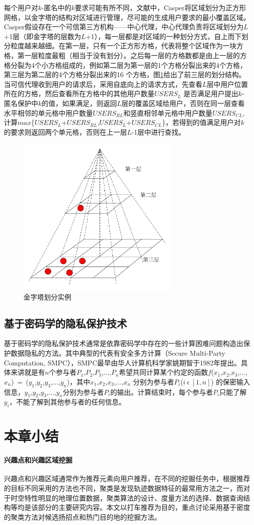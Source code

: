 每个用户对$k$-匿名中的$k$要求可能有所不同，文献\cite{Mokbel}中，Casper将区域划分为正方形网格，以金字塔的结构对区域进行管理，尽可能的生成用户要求的最小覆盖区域。Casper假设存在一个可信第三方机构——中心代理，中心代理负责将区域划分为$L$+1层（即金字塔的层数为$L$+1），每一层都是对区域的一种划分方式，自上而下划分粒度越来越细。在第一层，只有一个正方形方格，代表将整个区域作为一块方格，第一层粒度最粗（相当于没有划分）。之后每一层的方格数都是由上一层的方格分裂为4个小方格组成的，例如第二层为第一层的1个方格分裂出来的4个方格，第三层为第二层的4个方格分裂出来的16 个方格，图\ref{fig:GoldTower_pdf}给出了前三层的划分结构。当可信代理收到用户的请求后，采用自底向上的请求方式，先查看$L$层中用户位置所在的方格，然后查看所在方格中的其他用户数量$USERS_L$ 是否满足用户提出$k$- 匿名保护中$k$的值，如果满足，则返回$L$层的覆盖区域给用户，否则在同一层查看水平相邻的单元格中用户数量$USERS_{RL}$和竖直相邻单元格中用户数量$USERS_{CL}$, 计算$max$\{$USERS_L$+$USERS_{RL}$,$USERS_L$+$USERS_{CL}$\}，若得到的值满足用户对$k$的要求则返回两个单元格，否则在上一层$L$-1层中进行查找。
\begin{figure}[H]
\centering
\includegraphics[width=8cm]{fig/GoldTower.pdf}
\caption{金字塔划分实例} %
\label{fig:GoldTower_pdf}
\end{figure}
\subsection{基于密码学的隐私保护技术}
基于密码学的隐私保护技术通常是依靠密码学中存在的一些计算困难问题构造出保护数据隐私的方法。其中典型的代表有安全多方计算（Secure Multi-Party Computation, SMPC），SMPC最早由华人计算机科学家姚期智于1982年提出\cite{}。具体来讲就是有$n$个参与者$P_1$,$P_2$,$P_3$,...,$P_n$希望共同计算某个约定的函数$f$($x_1$,$x_2$,$x_3$,...,$x_n$)~=~($y_1$,$y_2$,$y_3$,...,$y_n$)，其中$x_1$,$x_2$,$x_3$,...,$x_n$ 分别为参与者$P_i$($i ~\epsilon ~[1,n]$) 的保密输入信息，$y_1$,$y_2$,$y_3$,...,$y_n$分别为参与者$P_i$的输出。计算结束时，每个参与者$P_i$只能了解$y_i$，不能了解到其他参与者的任何信息。

\section{本章小结}
\paragraph{兴趣点和兴趣区域挖掘}

兴趣点和兴趣区域通常作为推荐元素向用户推荐，在不同的挖掘任务中，根据推荐的目标不同采用的方法也不同，聚类是发现轨迹数据特征的最常用方法之一，而对于时空特性明显的地理位置数据，聚类算法的设计、度量方法的选择、数据查询结构等均是该部分的主要研究内容。本文以打车推荐为目的，重点讨论采用基于密度的聚类方法对候选扬招点和热门目的地的挖掘方法。


